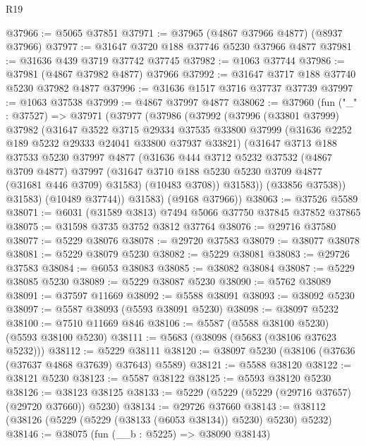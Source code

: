 \begin{lexlean}{R19}
\begin{coremodule}
@37966 := @5065 @37851
@37971 := @37965 (@4867 @37966 @4877) (@8937 @37966)
@37977 := @31647 @3720 @188 @37746 @5230 @37966 @4877
@37981 := @31636 @439 @3719 @37742 @37745
@37982 := @1063 @37744
@37986 := @37981 (@4867 @37982 @4877) @37966
@37992 := @31647 @3717 @188 @37740 @5230 @37982 @4877
@37996 := @31636 @1517 @3716 @37737 @37739
@37997 := @1063 @37538
@37999 := @4867 @37997 @4877
@38062 := @37960
    (fun ("_" : @37527) =>
    @37971
      (@37977
        (@37986
          (@37992
            (@37996
              (@33801 @37999)
              @37982
              (@31647
                @3522
                @3715
                @29334
                @37535
                @33800
                @37999
                (@31636 @2252 @189 @5232 @29333 @24041 @33800 @37937 @33821)
                (@31647
                  @3713
                  @188
                  @37533
                  @5230
                  @37997
                  @4877
                  (@31636
                    @444
                    @3712
                    @5232
                    @37532
                    (@4867 @3709 @4877)
                    @37997
                    (@31647 @3710 @188 @5230 @5230 @3709 @4877 (@31681 @446 @3709) @31583)
                    (@10483 @3708))
                  @31583))
              (@33856 @37538))
            @31583)
          (@10489 @37744))
        @31583)
      (@9168 @37966))
@38063 := @37526 @5589
@38071 := @6031 (@31589 @3813) @7494 @5066 @37750 @37845 @37852 @37865
@38075 := @31598 @3735 @3752 @3812 @37764
@38076 := @29716 @37580
@38077 := @5229 @38076
@38078 := @29720 @37583
@38079 := @38077 @38078
@38081 := @5229 @38079 @5230
@38082 := @5229 @38081
@38083 := @29726 @37583
@38084 := @6053 @38083
@38085 := @38082 @38084
@38087 := @5229 @38085 @5230
@38089 := @5229 @38087 @5230
@38090 := @5762 @38089
@38091 := @37597 @11669
@38092 := @5588 @38091
@38093 := @38092 @5230
@38097 := @5587 @38093 (@5593 @38091 @5230)
@38098 := @38097 @5232
@38100 := @7510 @11669 @846
@38106 := @5587 (@5588 @38100 @5230) (@5593 @38100 @5230)
@38111 := @5683 (@38098 (@5683 (@38106 @37623 @5232)))
@38112 := @5229 @38111
@38120 := @38097 @5230 (@38106 (@37636 (@37637 @4868 @37639) @37643) @5589)
@38121 := @5588 @38120
@38122 := @38121 @5230
@38123 := @5587 @38122
@38125 := @5593 @38120 @5230
@38126 := @38123 @38125
@38133 := @5229 (@5229 (@5229 (@29716 @37657) (@29720 @37660)) @5230)
@38134 := @29726 @37660
@38143 := @38112 (@38126 (@5229 (@5229 (@38133 (@6053 @38134)) @5230) @5230) @5232)
@38146 := @38075 (fun (__b : @5225) => @38090 @38143)

\end{coremodule}
\end{lexlean}
